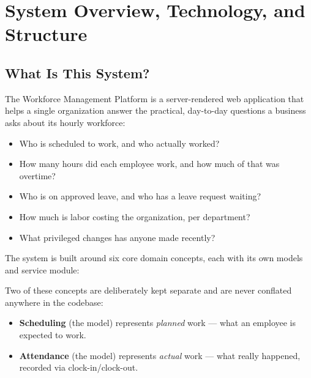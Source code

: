 \chapter{System Overview, Technology, and Structure}

\section{What Is This System?}

The Workforce Management Platform is a server-rendered web application
that helps a single organization answer the practical, day-to-day
questions a business asks about its hourly workforce:

\begin{itemize}[nosep]
  \item Who is scheduled to work, and who actually worked?
  \item How many hours did each employee work, and how much of that was
        overtime?
  \item Who is on approved leave, and who has a leave request waiting?
  \item How much is labor costing the organization, per department?
  \item What privileged changes has anyone made recently?
\end{itemize}

The system is built around six core domain concepts, each with its own
models and service module:

\begin{center}
\end{center}

Two of these concepts are deliberately kept separate and are never
conflated anywhere in the codebase:

\begin{itemize}
  \item \textbf{Scheduling} (the  model) represents
        \emph{planned} work --- what an employee is expected to work.
  \item \textbf{Attendance} (the  model)
        represents \emph{actual} work --- what really happened, recorded
        via clock-in/clock-out.
\end{itemize}

